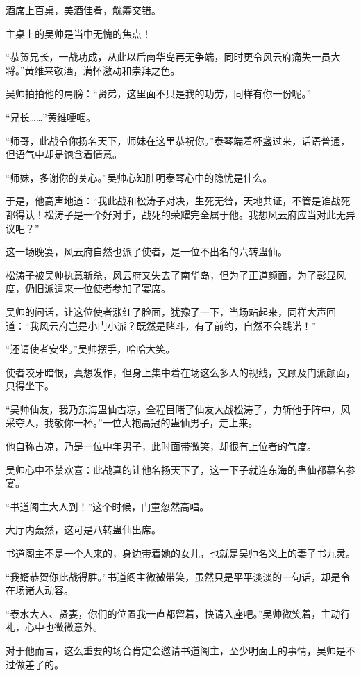 \begin{this_body}
酒席上百桌，美酒佳肴，觥筹交错。

主桌上的吴帅是当中无愧的焦点！

“恭贺兄长，一战功成，从此以后南华岛再无争端，同时更令风云府痛失一员大将。”黄维来敬酒，满怀激动和崇拜之色。

吴帅拍拍他的肩膀：“贤弟，这里面不只是我的功劳，同样有你一份呢。”

“兄长……”黄维哽咽。

“师哥，此战令你扬名天下，师妹在这里恭祝你。”泰琴端着杯盏过来，话语普通，但语气中却是饱含着情意。

“师妹，多谢你的关心。”吴帅心知肚明泰琴心中的隐忧是什么。

于是，他高声地道：“我此战和松涛子对决，生死无咎，天地共证，不管是谁战死都得认！松涛子是一个好对手，战死的荣耀完全属于他。我想风云府应当对此无异议吧？”

这一场晚宴，风云府自然也派了使者，是一位不出名的六转蛊仙。

松涛子被吴帅执意斩杀，风云府又失去了南华岛，但为了正道颜面，为了彰显风度，仍旧派遣来一位使者参加了宴席。

吴帅的问话，让这位使者涨红了脸面，犹豫了一下，当场站起来，同样大声回道：“我风云府岂是小门小派？既然是赌斗，有了前约，自然不会践诺！”

“还请使者安坐。”吴帅摆手，哈哈大笑。

使者咬牙暗恨，真想发作，但身上集中着在场这么多人的视线，又顾及门派颜面，只得坐下。

“吴帅仙友，我乃东海蛊仙古凉，全程目睹了仙友大战松涛子，力斩他于阵中，风采夺人，我敬你一杯。”一位大袍高冠的蛊仙男子，走上来。

他自称古凉，乃是一位中年男子，此时面带微笑，却很有上位者的气度。

吴帅心中不禁欢喜：此战真的让他名扬天下了，这一下子就连东海的蛊仙都慕名参宴。

“书道阁主大人到！”这个时候，门童忽然高唱。

大厅内轰然，这可是八转蛊仙出席。

书道阁主不是一个人来的，身边带着她的女儿，也就是吴帅名义上的妻子书九灵。

“我婿恭贺你此战得胜。”书道阁主微微带笑，虽然只是平平淡淡的一句话，却是令在场诸人动容。

“泰水大人、贤妻，你们的位置我一直都留着，快请入座吧。”吴帅微笑着，主动行礼，心中也微微意外。

对于他而言，这么重要的场合肯定会邀请书道阁主，至少明面上的事情，吴帅是不过做差了的。


\end{this_body}
